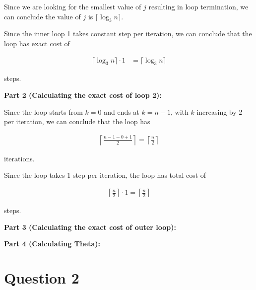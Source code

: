 \documentclass[12pt]{article}
\begin{document}
\begin{enumerate}[a.]
    \bigskip

    Since we are looking for the smallest value of $j$ resulting in loop termination,
    we can conclude the value of $j$ is $\lceil \log_3 n \rceil$.

    \bigskip

    Since the inner loop 1 takes constant step per iteration, we can conclude that
    the loop has exact cost of

    \begin{align}
        \lceil \log_3 n \rceil \cdot 1 &= \lceil \log_3 n \rceil
    \end{align}

    steps.

    \bigskip

    \textbf{Part 2 (Calculating the exact cost of loop 2):}

    \bigskip

    Since the loop starts from $k = 0$ and ends at $k = n - 1$, with $k$ increasing
    by 2 per iteration, we can conclude that the loop has

    \begin{align}
        \left\lceil \frac{n - 1 -0 + 1}{2} \right\rceil = \left\lceil \frac{n}{2} \right\rceil
    \end{align}

    iterations.

    \bigskip

    Since the loop takes 1 step per iteration, the loop has total cost of

    \begin{align}
        \left\lceil \frac{n}{2} \right\rceil \cdot 1 = \left\lceil \frac{n}{2} \right\rceil
    \end{align}

    steps.

    \bigskip

    \textbf{Part 3 (Calculating the exact cost of outer loop):}

    \bigskip

    \textbf{Part 4 (Calculating Theta):}

\end{enumerate}

\section*{Question 2}
\end{document}
